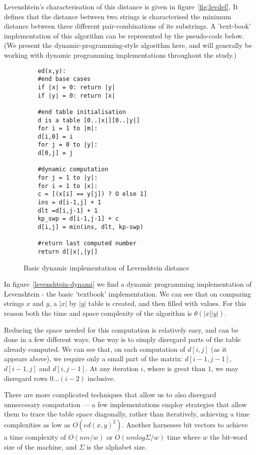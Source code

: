 Levenshtein's characterisation of this distance is given in
figure~\ref{fig:levdef}. It defines that the distance between two
strings is characterised the minimum distance between three different
pair-combinations of its substrings. A 'text-book' implementation of
this algorithm can be represented by the pseudo-code below. (We
present the dynamic-programming-style algorithm here, and will
generally be working with dynamic programming implementations
throughout the study.)

\begin{figure}
  \centering
  \begin{lstlisting}
    ed(x,y):
    #end base cases
    if |x| = 0: return |y|
    if |y| = 0: return |x|    

    #end table initialisation
    d is a table [0..|x|][0..|y|]
    for i = 1 to |m|:
    d[i,0] = i
    for j = 0 to |y|:
    d[0,j] = j           
    
    #dynamic computation
    for j = 1 to |y|:
    for i = 1 to |x|:
    c = [(x[i] == y[j]) ? O else 1]
    ins = d[i-1,j] + 1
    dlt =d[i,j-1] + 1
    kp_swp = d[i-1,j-1] + c
    d[i,j] = min(ins, dlt, kp-swp)
    
    #return last computed number
    return d[|x|,|y|]
  \end{lstlisting}
  \caption{Basic dynamic implementation of Levenshtein distance}
  \label{fig:levenshtein-dynamic}
\end{figure}

In figure~\ref{levenshtein-dynami} we find a dynamic programming
implementation of Levenshtein - the basic 'textbook'
implementation. We can see that on comparing strings $x$ and $y$, a
$|x|$ by $|y|$ table is created, and then filled with values. For this
reason both the time and space complexity of the algorithm is $\theta
(|x||y|)$.

Reducing the space needed for this computation is relatively easy, and
can be done in a few different ways. One way is to simply disregard
parts of the table already computed. We can see that, on each
computation of $d[i,j]$ (as it appears above), we require only a small
part of the matrix: $d[i-1,j-1]$, $d[i-1,j]$ and $d[i,j-1]$. At any
iteration $i$, where is great than $1$, we may disregard rows $0 \dots
(i-2)$ inclusive.

There are more complicated techniques that allow us to also disregard
unneccesary computation --- a few implementations employ strategies
that allow them to trace the table space diagonally, rather than
iteratively, achieving a time complexities as low as $O(ed(x,
y)^2)$.\cite{Chang1992} Another harnesses bit vectors to achieve a
time complexity of $O(nm/w)$ or $O(nm log {\Sigma}/w)$ time where $w$
the bit-word size of the machine, and $\Sigma$ is the alphabet
size.\cite{Myers1999}\cite{Hyyro2003} 

